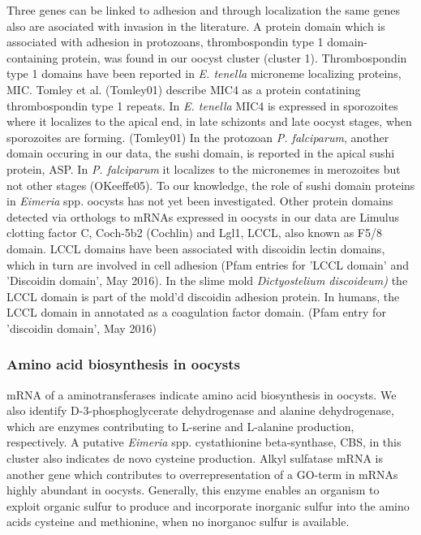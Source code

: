 \documentclass{bmcart}
\begin{document}
Three genes can be linked to adhesion and through localization the same genes
also are asociated with invasion in the literature. 
A protein domain which is associated with adhesion in protozoans, thrombospondin type 1 
domain-containing protein, was found in our oocyst cluster (cluster 1). 
Thrombospondin type 1 domains have been reported in \textit{E. tenella} microneme localizing 
proteins, MIC. Tomley et al. (Tomley01) describe MIC4 as a protein contatining thrombospondin 
type 1 repeats. In \textit{E. tenella} MIC4 is expressed in sporozoites where it localizes to the 
apical end, in late schizonts and late oocyst stages, when sporozoites are forming.
(Tomley01)
In the protozoan \textit{P. falciparum}, another domain occuring in our data, the sushi domain, 
is reported in the apical sushi protein, ASP. In \textit{P. falciparum} it localizes to the 
micronemes in merozoites but not other stages (OKeeffe05). To our knowledge, the role of sushi 
domain proteins in \textit{Eimeria} spp. oocysts has not yet been investigated. 
  Other protein domains detected via orthologs to mRNAs expressed in oocysts in our data are
Limulus clotting factor C, Coch-5b2 (Cochlin) and Lgl1, LCCL, also known as F5/8 domain. 
LCCL domains have  been associated with discoidin lectin domains, which in turn are involved 
in cell adhesion (Pfam entries for 'LCCL domain' and 'Discoidin domain', May 2016). 
In the slime mold \textit{Dictyostelium discoideum)} the LCCL domain
is part of the mold'd discoidin adhesion protein. In humans, the LCCL domain in annotated as a 
coagulation factor domain. (Pfam entry for 'discoidin domain', May 2016)

\subsubsection*{Amino acid biosynthesis in oocysts}
mRNA of a aminotransferases indicate amino acid biosynthesis in oocysts. 
We also identify D-3-phosphoglycerate dehydrogenase and alanine dehydrogenase, which are enzymes 
contributing to L-serine and L-alanine production, respectively. A putative \textit{Eimeria} spp.
cystathionine beta-synthase, CBS, in this cluster also indicates de novo cysteine production. 
Alkyl sulfatase mRNA is another gene which contributes to overrepresentation of a GO-term in 
mRNAs highly abundant in oocysts. Generally, this enzyme enables an organism to exploit organic 
sulfur to produce and incorporate inorganic sulfur into the amino acids cysteine and methionine, 
when no inorganoc sulfur is available. 
\end{document}
